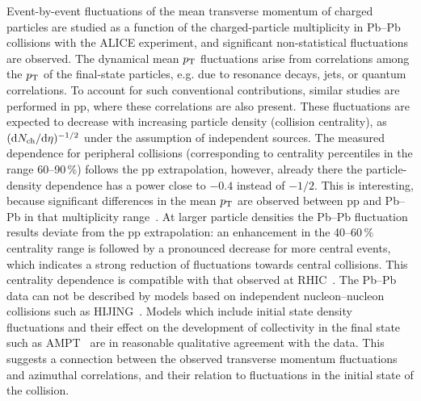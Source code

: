 Event-by-event fluctuations of the mean transverse momentum of charged particles are studied as a function of the charged-particle multiplicity in Pb--Pb collisions with the ALICE experiment, and significant non-statistical fluctuations are observed. The dynamical mean $p_{\rm T}$ fluctuations arise from correlations among the $p_{\rm T}$ of the final-state particles, e.g. due to resonance decays, jets, or quantum correlations. To account for such conventional contributions, similar studies are performed in pp, where these correlations are also present.  These fluctuations are expected to decrease with increasing particle density (collision centrality), as $({\rm d}N_{\rm ch}/{\rm d}\eta)^{-1/2}$ under the assumption of independent sources. The measured dependence for peripheral collisions (corresponding to centrality percentiles in the range 60--90\,\%) follows the pp extrapolation, however, already there the particle-density dependence has a power close to $-0.4$ instead of $-1/2$. This is interesting, because significant differences in the mean $p_{\rm T}$ are observed between pp and Pb--Pb in that multiplicity range~\cite{Abelev:2013bla}. At larger particle densities the Pb--Pb fluctuation results deviate from the pp extrapolation: an enhancement in the 40--60\,\% centrality range is followed by a pronounced decrease for more central events, which indicates a strong reduction of fluctuations towards central collisions. This centrality dependence is compatible with that observed at RHIC~\cite{Adams:2005ka}. The Pb--Pb data can not be described by models based on independent nucleon--nucleon collisions such as HIJING~\cite{Wang:1991hta,Deng:2010xg}. Models which include initial state density fluctuations and their effect on the development of collectivity in the final state such as AMPT~\cite{Lin:2004en} are in reasonable qualitative agreement with the data. This suggests a connection between the observed transverse momentum fluctuations and azimuthal correlations, and their relation to fluctuations in the initial state of the collision.

